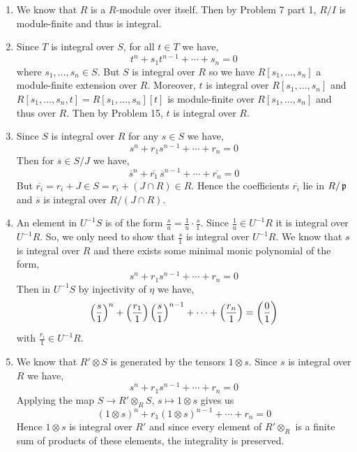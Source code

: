 \documentclass[Notebook.tex]{subfiles}
\begin{document}
\begin{solution}
    \bbni
    \begin{enumerate}
        \item We know that $R$ is a $R$-module over itself. Then by Problem 7 part 1, $R/I$ is module-finite and thus is integral. 
        
        \item Since $T$ is integral over $S$, for all $t \in T$ we have, 
        \[t^n + s_1t^{n-1} + \cdots + s_n = 0 \]
        where $s_1, \ldots, s_n \in S$. But $S$ is integral over $R$ so we have $R[s_1, \ldots, s_n]$ a module-finite extension over $R$. Moreover, $t$ is integral over $R[s_1, \ldots, s_n]$ and $R[s_1, \ldots, s_n, t] = R[s_1, \ldots, s_n][t]$ is module-finite over $R[s_1, \ldots, s_n]$ and thus over $R$. Then by Problem 15, $t$ is integral over $R$. 

        \item  Since $S$ is integral over $R$ for any $s\in S$ we have, 
        \[s^n + r_1s^{n-1} + \cdots + r_n = 0\]
        Then for $\overline{s} \in S/J$ we have, 
        \[\overline{s}^n + \overline{r_1}\,\overline{s}^{n-1} + \cdots + \overline{r_n} = 0\]
        But $\overline{r_i} = r_i + J  \in S = r_i + (J \cap R) \in R$. 
        Hence the coefficients $\overline{r_i}$ lie in $R/\operatorname{\mathfrak{p}}$ and $\overline{s}$ is integral over $R/(J \cap R)$. 
        \item An element in $U^{-1}S$ is of the form $\frac{s}{u} = \frac{1}{u} \cdot \frac{s}{1}$. Since $\frac{1}{u} \in U^{-1}R$ it is integral over $U^{-1}R$. So, we only need to show that $\frac{s}{1}$ is integral over $U^{-1}R$. We know that $s$ is integral over $R$ and there exists some minimal monic polynomial of the form, 
        \[s^n + r_1s^{n-1} + \cdots + r_n = 0\]
        Then in $U^{-1}S$ by injectivity of $\eta$ we have, 
        \[\left(\frac{s}{1}\right)^n + \left(\frac{r_1}{1}\right)\left(\frac{s}{1}\right)^{n-1} + \cdots + \left(\frac{r_n}{1}\right) = \left(\frac{0}{1}\right)\]
        with $\frac{r_i}{1} \in U^{-1}R$. 
        \item We know that $R' \otimes S$ is generated by the tensors $1 \otimes s$. Since $s$ is integral over $R$ we have, 
        \[s^n + r_1s^{n-1} + \cdots + r_n = 0\]
        Applying the map $S \to R' \otimes_R S$, $s \mapsto 1 \otimes s$ gives us
        \[(1 \otimes s)^n + r_1(1 \otimes s)^{n-1} + \cdots + r_n = 0\]
        Hence $1\otimes s$ is integral over $R'$ and since every element of $R'\otimes_R$ is a finite sum of products of these elements, the integrality is preserved.
    \end{enumerate}
\end{solution}
\end{document}
